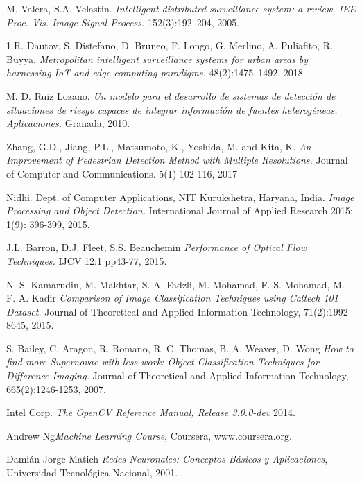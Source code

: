 \documentclass[a4paper,12pt,oneside,spanish]{book}
\begin{document}
\newpage

\newpage	
\begin{thebibliography}{9}
	M. Valera, S.A. Velastin. \textit{Intelligent distributed surveillance system: a review. IEE Proc. Vis. Image Signal Process.} 152(3):192–204, 2005.
	
	1.R. Dautov, S. Distefano, D. Bruneo, F. Longo, G. Merlino, A. Puliafito, R. Buyya. \textit{Metropolitan intelligent surveillance systems for urban areas by harnessing IoT and edge computing paradigms.} 48(2):1475–1492, 2018.

	M. D. Ruiz Lozano. \textit{Un modelo para el desarrollo de sistemas de detección de situaciones de riesgo capaces de integrar información de fuentes heterogéneas. Aplicaciones.} Granada, 2010.

	Zhang, G.D., Jiang, P.L., Matsumoto, K., Yoshida, M. and Kita, K. \textit{An Improvement of Pedestrian Detection Method with Multiple Resolutions.} Journal of Computer and Communications. 5(1) 102-116, 2017

	Nidhi. Dept. of Computer Applications, NIT Kurukshetra, Haryana, India. \textit{Image Processing and Object Detection.} International Journal of Applied Research 2015; 1(9): 396-399, 2015.
	
	J.L. Barron, D.J. Fleet, S.S. Beauchemin \textit{Performance of Optical Flow Techniques.} IJCV 12:1 pp43-77, 2015.
	
	N. S. Kamarudin, M. Makhtar, S. A. Fadzli, M. Mohamad, F. S. Mohamad, M. F. A. 
	Kadir \textit{Comparison of Image Classification Techniques using Caltech 101 Dataset.} Journal of Theoretical and Applied Information Technology, 71(2):1992-8645, 2015.
	
	S. Bailey, C. Aragon, R. Romano, R. C. Thomas, B. A. Weaver, D. Wong \textit{How to find more Supernovae with less work: Object Classification Techniques for Difference Imaging.} Journal of Theoretical and Applied Information Technology, 665(2):1246-1253, 2007.	
	
	Intel Corp. \textit{The OpenCV Reference Manual, Release 3.0.0-dev} 2014.	
			
	Andrew Ng\textit{Machine Learning Course}, Coursera, www.coursera.org.	
	
	Damián Jorge Matich \textit{Redes Neuronales: Conceptos Básicos y Aplicaciones}, Universidad Tecnológica Nacional, 2001.	
	

\end{thebibliography}
\end{document}

